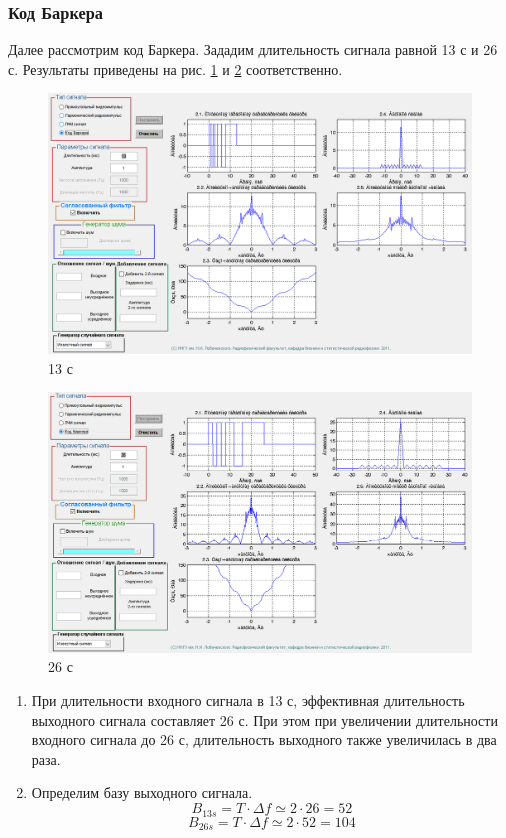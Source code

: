 \subsubsection{Код Баркера}
Далее рассмотрим код Баркера. Зададим длительность сигнала равной 13 с и 26 с.
Результаты приведены на рис. \ref{fig:task_2_4_13} и \ref{fig:task_2_4_26} соответственно.
\begin{figure}[H]
    \centering
    \includegraphics[width=0.9\linewidth]{imgs/task_2/t2s4_13.png}
    \caption{13 с}
    \label{fig:task_2_4_13}
\end{figure}
\begin{figure}[H]
    \centering
    \includegraphics[width=0.9\linewidth]{imgs/task_2/t2s4_26.png}
    \caption{26 с}
    \label{fig:task_2_4_26}
\end{figure}

\begin{enumerate}
    \item При длительности входного сигнала в 13 с, эффективная длительность выходного сигнала составляет
    26 с. При этом при увеличении длительности входного сигнала до 26 с, длительность выходного также увеличилась в два раза.
    \item Определим базу выходного сигнала. 
    \begin{equation}
        B_{13 s} = T \cdot \Delta f \simeq 2 \cdot 26 = 52
    \end{equation}
    \begin{equation}
        B_{26 s} = T \cdot \Delta f \simeq 2 \cdot 52 = 104
    \end{equation}

\end{enumerate}
